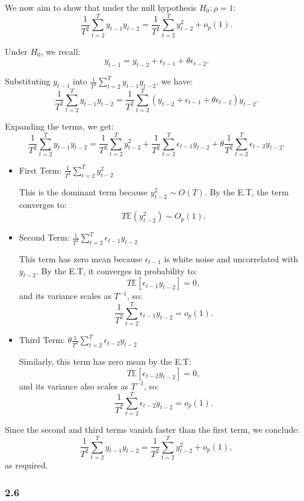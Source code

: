 \documentclass{article}
\begin{document}
We now aim to show that under the null hypothesis \( H_0: \rho = 1 \):
\[
\frac{1}{T^2} \sum_{t=2}^T y_{t-1} y_{t-2} = \frac{1}{T^2} \sum_{t=2}^T y_{t-2}^2 + o_p(1).
\]

Under \( H_0 \), we recall:
\[
y_{t-1} = y_{t-2} + \epsilon_{t-1} + \theta \epsilon_{t-2}.
\]

Substituting \( y_{t-1} \) into \( \frac{1}{T^2} \sum_{t=2}^T y_{t-1} y_{t-2} \), we have:
\[
\frac{1}{T^2} \sum_{t=2}^T y_{t-1} y_{t-2} = \frac{1}{T^2} \sum_{t=2}^T (y_{t-2} + \epsilon_{t-1} + \theta \epsilon_{t-2}) y_{t-2}.
\]

Expanding the terms, we get:
\[
\frac{1}{T^2} \sum_{t=2}^T y_{t-1} y_{t-2} = \frac{1}{T^2} \sum_{t=2}^T y_{t-2}^2 + \frac{1}{T^2} \sum_{t=2}^T \epsilon_{t-1} y_{t-2} + \theta \frac{1}{T^2} \sum_{t=2}^T \epsilon_{t-2} y_{t-2}.
\]

\begin{itemize}
    \item First Term: \( \frac{1}{T^2} \sum_{t=2}^T y_{t-2}^2 \)

    This is the dominant term because \( y_{t-2}^2 \sim O(T) \). By the E.T, the term converges to:
    \[
    T\mathbb{E}(y_{t-2}^2) \sim O_p(1).
    \]

    \item Second Term: \( \frac{1}{T^2} \sum_{t=2}^T \epsilon_{t-1} y_{t-2} \)

    This term has zero mean because \( \epsilon_{t-1} \) is white noise and uncorrelated with \( y_{t-2} \). By the E.T, it converges in probability to:
    \[
    T\mathbb{E}[\epsilon_{t-1} y_{t-2}] = 0,
    \]
    and its variance scales as \( T^{-1} \), so:
    \[
    \frac{1}{T^2} \sum_{t=2}^T \epsilon_{t-1} y_{t-2} = o_p(1).
    \]

    \item Third Term: \( \theta \frac{1}{T^2} \sum_{t=2}^T \epsilon_{t-2} y_{t-2} \)

    Similarly, this term has zero mean by the E.T:
    \[
    T\mathbb{E}[\epsilon_{t-2} y_{t-2}] = 0,
    \]
    and its variance also scales as \( T^{-1} \), so:
    \[
    \frac{1}{T^2} \sum_{t=2}^T \epsilon_{t-2} y_{t-2} = o_p(1).
    \]
\end{itemize}

Since the second and third terms vanish faster than the first term, we conclude:
\[
\frac{1}{T^2} \sum_{t=2}^T y_{t-1} y_{t-2} = \frac{1}{T^2} \sum_{t=2}^T y_{t-2}^2 + o_p(1),
\]
as required.

\subsubsection*{2.6}
\end{document}
